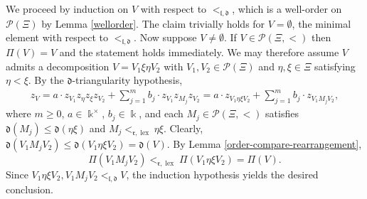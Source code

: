 \documentclass{article}
\makeatletter
\renewenvironment{proof}[1][\proofname]{\par
	\pushQED{\qed}%
	\normalfont \topsep6\p@\@plus6\p@\relax
	\trivlist
	\item[\hskip\labelsep
	\bfseries
	#1\@addpunct{.}]\ignorespaces
}{%
	\popQED\endtrivlist\@endpefalse
}
\theoremstyle{plain}
\theoremstyle{definition}
\numberwithin{equation}{section}
\DeclareMathOperator{\lex}{lex}
\newcommand{\PP}{\mathcal{P}}
\newcommand{\dd}{\mathfrak{d}}
\newcommand{\rr}{\mathfrak{r}}
\makeatother
\begin{document}
	\begin{proof}
		We proceed by induction on $V$ with respect to $<_{\mathfrak{l}, \dd}$, which is a well-order on $\PP(\Xi)$ by Lemma \ref{wellorder}. The claim trivially holds for $V=\emptyset$, the minimal element with respect to $<_{\mathfrak{l}, \dd}$. Now suppose $V\neq \emptyset$. If $V\in \PP(\Xi, <)$ then $\Pi(V)=V$ and the statement holds immediately. We may therefore assume $V$ admits a decomposition $V=V_{1}\xi \eta V_{2}$ with $V_{1}, V_{2} \in \PP(\Xi)$ and $\eta,\xi \in \Xi$ satisfying $\eta< \xi$. By the $\dd$-triangularity hypothesis,
		\begin{eqnarray*}
			z_{V}= a \cdot z_{V_{1}} z_{\eta} z_{\xi} z_{V_{2}}  + \sum_{j=1}^{m} b_{j}\cdot z_{V_{1}} z_{M_{j}} z_{V_{2}} = a\cdot z_{V_{1} \eta\xi V_{2}} +\sum_{j=1}^{m} b_{j} \cdot z_{V_{1}M_{j}V_{2}},
		\end{eqnarray*}
		where $m\geq 0$, $a\in \Bbbk^{\times}$, $b_{j}\in \Bbbk$, and each $M_{j} \in \PP(\Xi,<)$ satisfies $\dd(M_{j}) \leq \dd(\eta\xi)$ and $M_{j}<_{\rr,\lex} \eta \xi$. Clearly, $\dd(V_{1}M_{j} V_{2}) \leq \dd(V_{1} \eta \xi V_{2}) =\dd(V)$. By Lemma \ref{order-compare-rearrangement},
		\[\Pi(V_{1}M_{j} V_{2}) <_{\rr,\lex} \Pi(V_{1} \eta \xi V_{2}) = \Pi(V).\]
		Since $V_{1}\eta\xi V_{2}, V_{1} M_{j}V_{2} <_{\mathfrak{l}, \dd} V$, the induction hypothesis yields the desired conclusion.
	\end{proof}
	
\end{document}
